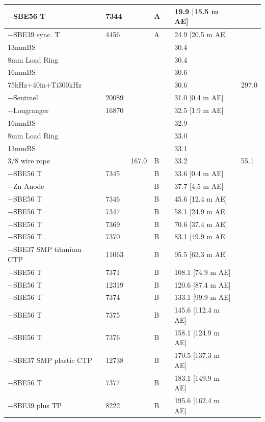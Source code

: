 \documentclass{article}
\begin{document}
\begin{tabularx}{\linewidth}{|X|X|l|l|l|X|l|}
$-$SBE56 T & 7344 &  & A &  & 19.9 [15.5 m AE] &  \\ \hline
$-$SBE39 sync. T & 4456 &  & A &  & 24.9 [20.5 m AE] &  \\ \hline
13mmBS &  &  &  &  & 30.4 &  \\ \hline
8mm Load Ring &  &  &  &  & 30.4 &  \\ \hline
16mmBS &  &  &  &  & 30.6 &  \\ \hline
75kHz+40in+Ti300kHz &  &  &  &  & 30.6 & 297.0 \\ \hline
$-$Sentinel & 20089 &  &  &  & 31.0 [0.4 m AE] &  \\ \hline
$-$Longranger & 16870 &  &  &  & 32.5 [1.9 m AE] &  \\ \hline
16mmBS &  &  &  &  & 32.9 &  \\ \hline
8mm Load Ring &  &  &  &  & 33.0 &  \\ \hline
13mmBS &  &  &  &  & 33.1 &  \\ \hline
3/8 wire rope &  & 167.0 & B &  & 33.2 & 55.1 \\ \hline
$-$SBE56 T & 7345 &  & B &  & 33.6 [0.4 m AE] &  \\ \hline
$-$Zn Anode &  &  & B &  & 37.7 [4.5 m AE] &  \\ \hline
$-$SBE56 T & 7346 &  & B &  & 45.6 [12.4 m AE] &  \\ \hline
$-$SBE56 T & 7347 &  & B &  & 58.1 [24.9 m AE] &  \\ \hline
$-$SBE56 T & 7369 &  & B &  & 70.6 [37.4 m AE] &  \\ \hline
$-$SBE56 T & 7370 &  & B &  & 83.1 [49.9 m AE] &  \\ \hline
$-$SBE37 SMP titanium CTP & 11063 &  & B &  & 95.5 [62.3 m AE] &  \\ \hline
$-$SBE56 T & 7371 &  & B &  & 108.1 [74.9 m AE] &  \\ \hline
$-$SBE56 T & 12319 &  & B &  & 120.6 [87.4 m AE] &  \\ \hline
$-$SBE56 T & 7374 &  & B &  & 133.1 [99.9 m AE] &  \\ \hline
$-$SBE56 T & 7375 &  & B &  & 145.6 [112.4 m AE] &  \\ \hline
$-$SBE56 T & 7376 &  & B &  & 158.1 [124.9 m AE] &  \\ \hline
$-$SBE37 SMP plastic CTP & 12738 &  & B &  & 170.5 [137.3 m AE] &  \\ \hline
$-$SBE56 T & 7377 &  & B &  & 183.1 [149.9 m AE] &  \\ \hline
$-$SBE39 plus TP & 8222 &  & B &  & 195.6 [162.4 m AE] &  \\ \hline

\end{tabularx}
\end{document}
